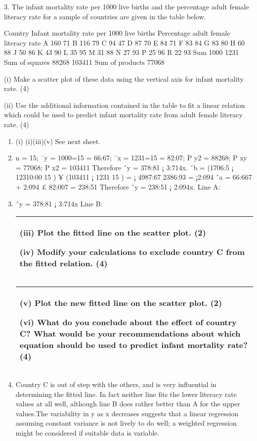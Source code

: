 \documentclass[a4paper,12pt]{article}
\begin{document}
3. The infant mortality rate per 1000 live births and the percentage adult female literacy rate for a sample of countries are given in the table below. 
 
 
Country 
Infant mortality rate per 1000 live births 
Percentage adult female literacy rate A 160 71 B 116 79 C 94 47 D 87 70 E 84 71 F 83 84 G 83 80 H 60 88 J 50 86 K 43 90 L 35 95 M 31 88 N 27 93 P 25 96 R 22 93 Sum 1000 1231 Sum of squares 88268 103411 Sum of products 77068 
 
(i) Make a scatter plot of these data using the vertical axis for infant mortality rate. (4) 
 
(ii) Use the additional information contained in the table to fit a linear relation which could be used to predict infant mortality rate from adult female literacy rate. (4) 
 

 


\begin{enumerate}
\item (i) (i)(iii)(v) See next sheet.
\item n = 15; ¯y = 1000=15 = 66:67; ¯x = 1231=15 = 82:07;
P
y2 = 88268;
P
xy =
77068;
P
x2 = 103411 Therefore ˆy = 378:81 ¡ 3:714x.
ˆb
= (1706:5 ¡
12310:00
15
) ¥ (103411 ¡
1231
15
) = ¡
4987:67
2386:93
= ¡2:094
ˆa = 66:667 + 2:094 £ 82:007 = 238:51 Therefore ˆy = 238:51 ¡ 2:094x. Line A:
\item ˆy = 378:81 ¡ 3:714x Line B:

\newpage
\begin{table}[ht!]
 \centering
 \begin{tabular}{|p{15cm}|}
 \hline  
(iii) Plot the fitted line on the scatter plot. 
(2) 
 
(iv) Modify your calculations to exclude country C from the fitted relation. 
(4) \\ \hline
  \end{tabular}
\end{table}

\begin{table}[ht!]
 \centering
 \begin{tabular}{|p{15cm}|}
 \hline  
(v) Plot the new fitted line on the scatter plot. 
(2) 
 
(vi) What do you conclude about the effect of country C?  What would be your recommendations about which equation should be used to predict infant mortality rate? (4) 
\\ \hline
  \end{tabular}
\end{table}
\item Country C is out of step with the others, and is very influential in determining the fitted
line. In fact neither line fits the lower literacy rate values at all well, although line B does
rather better than A for the upper values.The variability in y as x decreases suggests
that a linear regression assuming constant variance is not lively to do well; a weighted
regression might be considered if suitable data is variable.
\end{enumerate}
\end{document}
